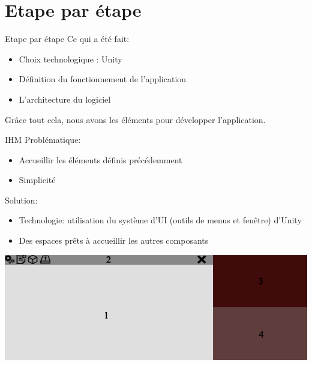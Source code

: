 \documentclass[a4paper,10pt]{beamer}
\begin{document}
	\section{Etape par étape}
			\begin{frame}{Etape par étape}
				Ce qui a été fait:
					\begin{itemize}
						\item Choix technologique : Unity
						\item Définition du fonctionnement de l'application
						\item L'architecture du logiciel
					\end{itemize}
				Grâce tout cela, nous avons les éléments pour développer l'application.
			\end{frame}
		
		
	\begin{frame}{IHM}
			Problématique:
				\begin{itemize}
					\item Accueillir les éléments définis précédemment
					\item Simplicité
				\end{itemize}
				
			Solution:
				\begin{itemize}
					\item Technologie: utilisation du système d'UI (outils de menus et fenêtre) d'Unity
					\item Des espaces prêts à accueillir les autres composants
				\end{itemize}
				\centerline{\includegraphics[scale=0.3]{images/Nono/img6.png}} 
	\end{frame}
	
\end{document}
